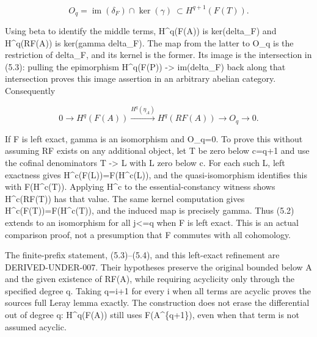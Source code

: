 \[
 O_q=\operatorname{im}(\delta_F)\cap\ker(\gamma)
                  \ \subset H^{q+1}(F(T)).                    \tag{5.3}
\]

Using beta to identify the middle terms,\allowbreak{} H\textasciicircum{}q(F(A)\allowbreak{})\allowbreak{} is ker(delta\_\allowbreak{}F)\allowbreak{} and H\textasciicircum{}q(RF(A)\allowbreak{})\allowbreak{} is ker(gamma delta\_\allowbreak{}F)\allowbreak{}. The map from the latter to O\_\allowbreak{}q is the restriction of delta\_\allowbreak{}F,\allowbreak{} and its kernel is the former. Its image is the intersection in (5.3)\allowbreak{}:\allowbreak{} pulling the epimorphism H\textasciicircum{}q(F(P)\allowbreak{})\allowbreak{} \allowbreak{}-> im(delta\_\allowbreak{}F)\allowbreak{} back along that intersection proves this image assertion in an arbitrary abelian category. Consequently

\[
0\to H^q(F(A))\xrightarrow{H^q(\eta_A)}H^q(RF(A))
                                      \longrightarrow O_q\to0.\tag{5.4}
\]

If F is left exact,\allowbreak{} gamma is an isomorphism and O\_\allowbreak{}q\allowbreak{}=0. To prove this without assuming RF exists on any additional object,\allowbreak{} let T be zero below c\allowbreak{}=q\allowbreak{}+1 and use the cofinal denominators T \allowbreak{}-> L with L zero below c. For each such L,\allowbreak{} left exactness gives H\textasciicircum{}c(F(L)\allowbreak{})\allowbreak{}\allowbreak{}=F(H\textasciicircum{}c(L)\allowbreak{})\allowbreak{},\allowbreak{} and the quasi-isomorphism identifies this with F(H\textasciicircum{}c(T)\allowbreak{})\allowbreak{}. Applying H\^{}c to the essential-constancy witness shows H\textasciicircum{}c(RF(T)\allowbreak{})\allowbreak{} has that value. The same kernel computation gives H\textasciicircum{}c(F(T)\allowbreak{})\allowbreak{}\allowbreak{}=F(H\textasciicircum{}c(T)\allowbreak{})\allowbreak{},\allowbreak{} and the induced map is precisely gamma. Thus (5.2)\allowbreak{} extends to an isomorphism for all j<\allowbreak{}=q when F is left exact. This is an actual comparison proof,\allowbreak{} not a presumption that F commutes with all cohomology.

The finite-prefix statement,\allowbreak{} (5.3)\allowbreak{}–\allowbreak{}(5.4)\allowbreak{},\allowbreak{} and this left-exact refinement are DERIVED-UNDER-007. Their hypotheses preserve the original bounded below A and the given existence of RF(A)\allowbreak{},\allowbreak{} while requiring acyclicity only through the specified degree q. Taking q\allowbreak{}=i\allowbreak{}+1 for every i when all terms are acyclic proves the source\textquotesingle s full Leray lemma exactly. The construction does not erase the differential out of degree q:\allowbreak{} H\textasciicircum{}q(F(A)\allowbreak{})\allowbreak{} still uses F(A\textasciicircum{}\{q\allowbreak{}+1\})\allowbreak{},\allowbreak{} even when that term is not assumed acyclic.

